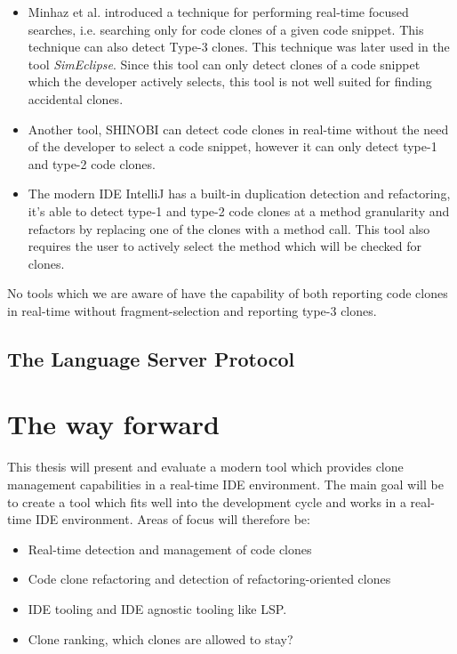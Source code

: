 \documentclass[12pt]{article}
\begin{document}
\begin{itemize}
	\item Minhaz et al. introduced a technique for performing real-time focused
	      searches, i.e. searching only for code clones of a given code snippet. This
	      technique can also detect Type-3 clones\cite{Zibran_real_time_search}.
	      This technique was later used in the tool
	      \textit{SimEclipse}\cite{Udding_Towards_Convenient_Management}. Since this tool
	      can only detect clones of a code snippet which the developer actively selects, this tool is
	      not well suited for finding accidental clones.

	\item Another tool, SHINOBI can detect code clones in real-time without the need
	      of the developer to select a code snippet, however it can only detect type-1
	      and type-2 code clones\cite{SHINOBI}.
	\item The modern IDE IntelliJ has a built-in duplication detection and
	      refactoring, it's able to detect type-1 and type-2 code clones at a method
	      granularity and refactors by replacing one of the clones with a method call.
          This tool also requires the user to actively select the method which will be
          checked for clones.
\end{itemize}

No tools which we are aware of have the capability of both reporting code clones in
real-time without fragment-selection and reporting type-3 clones.

\subsection{The Language Server Protocol}

\section{The way forward}

This thesis will present and evaluate a modern tool which provides clone management
capabilities in a real-time IDE environment. The main goal will be to create a tool which
fits well into the development cycle and works in a real-time IDE environment. Areas of
focus will therefore be:

\begin{itemize}
	\item Real-time detection and management of code clones
	\item Code clone refactoring and detection of refactoring-oriented clones
	\item IDE tooling and IDE agnostic tooling like LSP.
	\item Clone ranking, which clones are allowed to stay?
\end{itemize}
\end{document}
